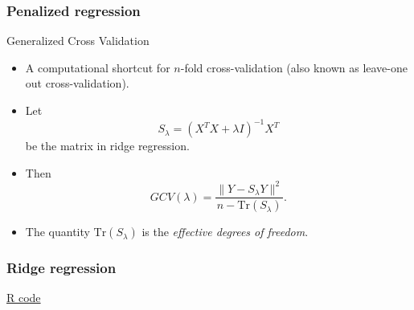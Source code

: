 \documentclass[handout]{beamer}
\newcommand{\Tr}{\text{Tr}}
\begin{document}

   \begin{frame} \frametitle{Penalized regression}

   \begin{block}
   { Generalized Cross Validation}
       \begin{itemize}

       \item A computational shortcut for $n$-fold cross-validation (also known as leave-one out cross-validation).

       \item Let
   $$
   S_{\lambda} = (X^TX + \lambda I)^{-1} X^T$$
   be the matrix in ridge regression.

   \item Then
   $$
   GCV(\lambda) =  \frac{\|Y - S_{\lambda}Y\|^2}{n - \Tr(S_{\lambda})}.$$

   \item The quantity $\Tr(S_{\lambda})$ is the {\em effective degrees of freedom}.
       \end{itemize}

   \end{block}
   \end{frame}



   \begin{frame}
   \frametitle{Ridge regression}
   \begin{center}
   \end{center}
   \href{http://www.stanford.edu/class/stats191/penalized.html#ridge-regression}{R code}
   \end{frame}

\end{document}
